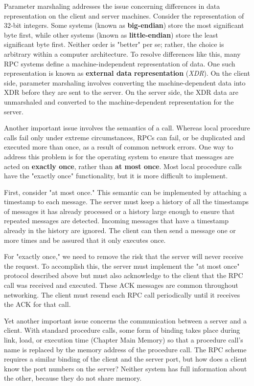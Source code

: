 Parameter marshaling addresses the issue concerning differences in data representation on the client and server machines. Consider the representation of 32-bit integers. Some systems (known as \textbf{big-endian}) store the most significant byte first, while other systems (known as \textbf{little-endian}) store the least significant byte first. Neither order is "better" per se; rather, the choice is arbitrary within a computer architecture. To resolve differences like this, many RPC systems define a machine-independent representation of data. One such representation is known as \textbf{external data representation} (\textit{XDR}). On the client side, parameter marshaling involves converting the machine-dependent data into XDR before they are sent to the server. On the server side, the XDR data are unmarshaled and converted to the machine-dependent representation for the server.

Another important issue involves the semantics of a call. Whereas local procedure calls fail only under extreme circumstances, RPCs can fail, or be duplicated and executed more than once, as a result of common network errors. One way to address this problem is for the operating system to ensure that messages are acted on \textbf{exactly once}, rather than \textbf{at most once}. Most local procedure calls have the "exactly once" functionality, but it is more difficult to implement.

First, consider "at most once." This semantic can be implemented by attaching a timestamp to each message. The server must keep a history of all the timestamps of messages it has already processed or a history large enough to ensure that repeated messages are detected. Incoming messages that have a timestamp already in the history are ignored. The client can then send a message one or more times and be assured that it only executes once.

For "exactly once," we need to remove the risk that the server will never receive the request. To accomplish this, the server must implement the "at most once" protocol described above but must also acknowledge to the client that the RPC call was received and executed. These ACK messages are common throughout networking. The client must resend each RPC call periodically until it receives the ACK for that call.

Yet another important issue concerns the communication between a server and a client. With standard procedure calls, some form of binding takes place during link, load, or execution time (Chapter Main Memory) so that a procedure call's name is replaced by the memory address of the procedure call. The RPC scheme requires a similar binding of the client and the server port, but how does a client know the port numbers on the server? Neither system has full information about the other, because they do not share memory.

